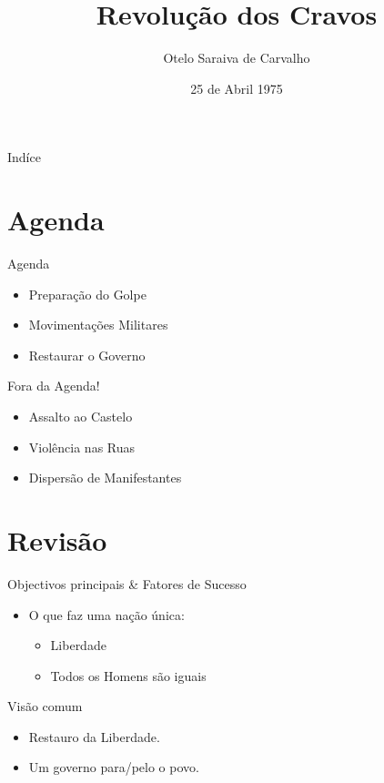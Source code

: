 \documentclass{beamer}
\title{Revolução dos Cravos}
\author{Otelo Saraiva de Carvalho}
\institute{Portugal}
\date{25 de Abril 1975}
\begin{document}
\begin{frame}
  \titlepage
\end{frame}

\begin{frame}{Indíce}
  \tableofcontents
\end{frame}
\section{Agenda}

\begin{frame}{Agenda}
\begin{itemize}
  \item Preparação do Golpe
  \item Movimentações Militares
  \item Restaurar o Governo
\end{itemize}
\end{frame}

\begin{frame}{Fora da Agenda!}
\begin{itemize}[<+->]
  \item Assalto ao Castelo
  \item Violência nas Ruas
  \item Dispersão de Manifestantes
\end{itemize}
\end{frame}

\section{Revisão}

\begin{frame}{Objectivos principais \& Fatores de Sucesso}
\begin{itemize}
  \item O que faz uma nação única:
  \begin{itemize}
    \item Liberdade
    \item Todos os Homens são iguais
  \end{itemize}
\end{itemize}
\begin{block}{Visão comum}
\begin{itemize}
  \item Restauro da Liberdade.
  \item Um governo para/pelo o povo.
\end{itemize}
\end{block}
\end{frame}
\end{document}
